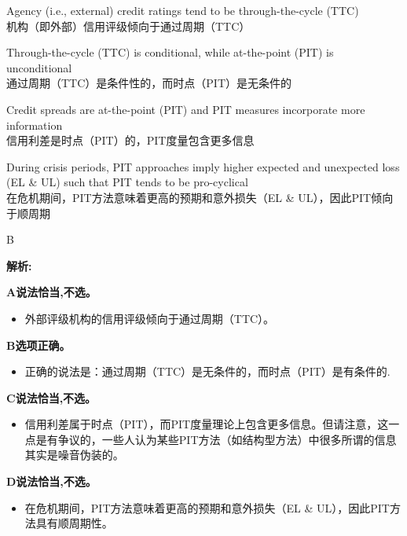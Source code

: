 \documentclass{article}
\newenvironment{explanation}
{\textbf{解析:}\par}
{\par}
\begin{document}
\begin{choices}
    \item Agency (i.e., external) credit ratings tend to be through-the-cycle (TTC)
    \\机构（即外部）信用评级倾向于通过周期（TTC）
    \item Through-the-cycle (TTC) is conditional, while at-the-point (PIT) is unconditional
    \\通过周期（TTC）是条件性的，而时点（PIT）是无条件的
    \item Credit spreads are at-the-point (PIT) and PIT measures incorporate more information
    \\信用利差是时点（PIT）的，PIT度量包含更多信息
    \item During crisis periods, PIT approaches imply higher expected and unexpected loss (EL \& UL) such that PIT tends to be pro-cyclical
    \\在危机期间，PIT方法意味着更高的预期和意外损失（EL \& UL），因此PIT倾向于顺周期
\end{choices}

\begin{correctanswer}
    B
\end{correctanswer}

\begin{explanation}
    \textbf{A说法恰当,不选。} 
    \begin{itemize}
        \item   外部评级机构的信用评级倾向于通过周期（TTC）。
    \end{itemize}

    \textbf{B选项正确。} 
    \begin{itemize}
        \item   正确的说法是：通过周期（TTC）是无条件的，而时点（PIT）是有条件的.
    \end{itemize}

    \textbf{C说法恰当,不选。} 
    \begin{itemize}
        \item   信用利差属于时点（PIT），而PIT度量理论上包含更多信息。但请注意，这一点是有争议的，一些人认为某些PIT方法（如结构型方法）中很多所谓的信息其实是噪音伪装的。
    \end{itemize}
    
    \textbf{D说法恰当,不选。} 
    \begin{itemize}
        \item   在危机期间，PIT方法意味着更高的预期和意外损失（EL \& UL），因此PIT方法具有顺周期性。
    \end{itemize}
    
\end{explanation}
\end{document}
